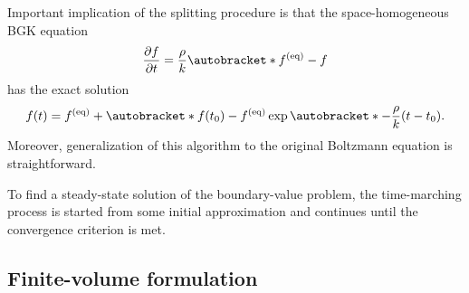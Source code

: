 \documentclass{article}
\newcommand{\pder}[2][]{\frac{\partial#1}{\partial#2}}
\DeclarePairedDelimiter\autobracket()       %
\newcommand{\br}[1]{\autobracket*{#1}}
\newcommand{\equil}[1]{#1^\mathrm{(eq)}}
\begin{document}
Important implication of the splitting procedure is that the space-homogeneous BGK equation
\begin{equation}\label{eq:bgk_homogeneous}
    \pder[f]{t} = \frac{\rho}k \br{\equil{f}-f}
\end{equation}
has the exact solution
\begin{equation}\label{eq:bgk_exact}
    f(t) = \equil{f} + \br{f(t_0)-\equil{f}}\exp\br{-\frac{\rho}k (t-t_0)}.
\end{equation}
Moreover, generalization of this algorithm to the original Boltzmann equation is straightforward.

To find a steady-state solution of the boundary-value problem,
the time-marching process is started from some initial approximation
and continues until the convergence criterion is met.

\subsection{Finite-volume formulation}\label{sec:fv}
\end{document}
